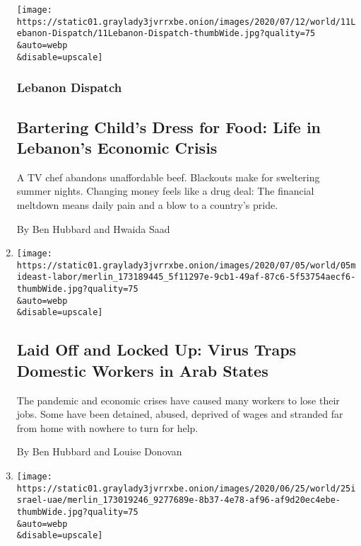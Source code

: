 \begin{enumerate}
  \texttt{[image: https://static01.graylady3jvrrxbe.onion/images/2020/07/12/world/11Lebanon-Dispatch/11Lebanon-Dispatch-thumbWide.jpg?quality=75\\\&auto=webp\\\&disable=upscale]}

  \hypertarget{lebanon-dispatch}{%
  \subsubsection{Lebanon Dispatch}\label{lebanon-dispatch}}

  \hypertarget{bartering-childs-dress-for-food-life-in-lebanons-economic-crisis}{%
  \subsection{Bartering Child's Dress for Food: Life in Lebanon's
  Economic
  Crisis}\label{bartering-childs-dress-for-food-life-in-lebanons-economic-crisis}}

  A TV chef abandons unaffordable beef. Blackouts make for sweltering
  summer nights. Changing money feels like a drug deal: The financial
  meltdown means daily pain and a blow to a country's pride.

  By Ben Hubbard and Hwaida Saad
\item
  \href{/2020/07/06/world/middleeast/coronavirus-saudi-domestic-workers-maids-arab.html}{}

  \texttt{[image: https://static01.graylady3jvrrxbe.onion/images/2020/07/05/world/05mideast-labor/merlin\_173189445\_5f11297e-9cb1-49af-87c6-5f53754aecf6-thumbWide.jpg?quality=75\\\&auto=webp\\\&disable=upscale]}

  \hypertarget{laid-off-and-locked-up-virus-traps-domestic-workers-in-arab-states}{%
  \subsection{Laid Off and Locked Up: Virus Traps Domestic Workers in
  Arab
  States}\label{laid-off-and-locked-up-virus-traps-domestic-workers-in-arab-states}}

  The pandemic and economic crises have caused many workers to lose
  their jobs. Some have been detained, abused, deprived of wages and
  stranded far from home with nowhere to turn for help.

  By Ben Hubbard and Louise Donovan
\item
  \href{/2020/06/25/world/middleeast/israel-united-arab-emirates-coronavirus.html}{}

  \texttt{[image: https://static01.graylady3jvrrxbe.onion/images/2020/06/25/world/25israel-uae/merlin\_173019246\_9277689e-8b37-4e78-af96-af9d20ec4ebe-thumbWide.jpg?quality=75\\\&auto=webp\\\&disable=upscale]}


\end{enumerate}
